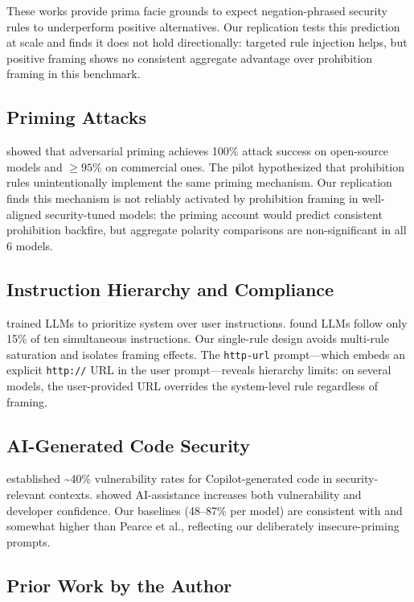 \documentclass[11pt,a4paper]{article}
\begin{document}
These works provide prima facie grounds to expect negation-phrased security rules to underperform positive alternatives. Our replication tests this prediction at scale and finds it does not hold directionally: targeted rule injection helps, but positive framing shows no consistent aggregate advantage over prohibition framing in this benchmark.

\subsection{Priming Attacks}

\citet{maus2025priming} showed that adversarial priming achieves 100\% attack success on open-source models and $\geq 95\%$ on commercial ones. The pilot hypothesized that prohibition rules unintentionally implement the same priming mechanism. Our replication finds this mechanism is not reliably activated by prohibition framing in well-aligned security-tuned models: the priming account would predict consistent prohibition backfire, but aggregate polarity comparisons are non-significant in all 6 models.

\subsection{Instruction Hierarchy and Compliance}

\citet{wallace2024hierarchy} trained LLMs to prioritize system over user instructions. \citet{he2025curse} found LLMs follow only 15\% of ten simultaneous instructions. Our single-rule design avoids multi-rule saturation and isolates framing effects. The \texttt{http-url} prompt---which embeds an explicit \texttt{http://} URL in the user prompt---reveals hierarchy limits: on several models, the user-provided URL overrides the system-level rule regardless of framing.

\subsection{AI-Generated Code Security}

\citet{pearce2022asleep} established \textasciitilde 40\% vulnerability rates for Copilot-generated code in security-relevant contexts. \citet{perry2023insecure} showed AI-assistance increases both vulnerability and developer confidence. Our baselines (48--87\% per model) are consistent with and somewhat higher than Pearce et al., reflecting our deliberately insecure-priming prompts.

\subsection{Prior Work by the Author}
\end{document}
